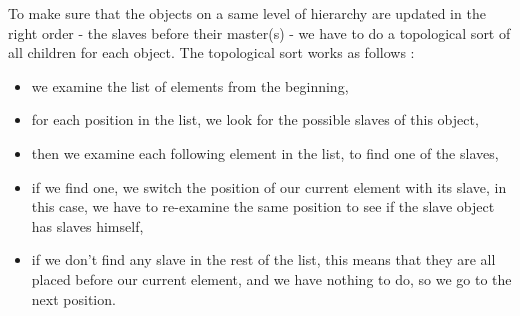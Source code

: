 \documentclass[a4paper]{article}
\begin{document}
%
%    
%

To make sure that the objects on a same level of hierarchy are updated in the right order - the slaves before their master(s) - we have to do a topological sort of all children for each object. The topological sort works as follows :
\begin{itemize}
  \item we examine the list of elements from the beginning,
  \item for each position in the list, we look for the possible slaves of this object,
  \item then we examine each following element in the list, to find one of the slaves,
  \item if we find one, we switch the position of our current element with its slave, in this case, we have to re-examine the same position to see if the slave object has slaves himself,
  \item if we don't find any slave in the rest of the list, this means that they are all placed before our current element, and we have nothing to do, so we go to the next position.
\end{itemize}
\end{document}
